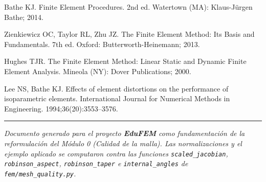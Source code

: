 \documentclass[11pt,a4paper]{article}
\begin{document}
\begin{enumerate}[label={[\arabic*]},leftmargin=24pt,itemsep=2pt]
\item\label{Bathe2014} Bathe KJ. Finite Element Procedures. 2nd ed. Watertown (MA): Klaus-J\"urgen
Bathe; 2014.

\item\label{Zienkiewicz2013} Zienkiewicz OC, Taylor RL, Zhu JZ. The Finite Element Method: Its
Basis and Fundamentals. 7th ed. Oxford: Butterworth-Heinemann; 2013.

\item\label{Hughes2000} Hughes TJR. The Finite Element Method: Linear Static and Dynamic Finite
Element Analysis. Mineola (NY): Dover Publications; 2000.

\item\label{Lee1994} Lee NS, Bathe KJ. Effects of element distortions on the performance of
isoparametric elements. International Journal for Numerical Methods in Engineering.
1994;36(20):3553--3576.

\end{enumerate}

\bigskip

\hrule
\medskip
\noindent\footnotesize\emph{Documento generado para el proyecto \textbf{EduFEM} como
fundamentaci\'on de la reformulaci\'on del M\'odulo 0 (Calidad de la malla). Las normalizaciones
y el ejemplo aplicado se computaron contra las funciones \texttt{scaled\_jacobian},
\texttt{robinson\_aspect}, \texttt{robinson\_taper} e \texttt{internal\_angles} de
\texttt{fem/mesh\_quality.py}.}
\end{document}
